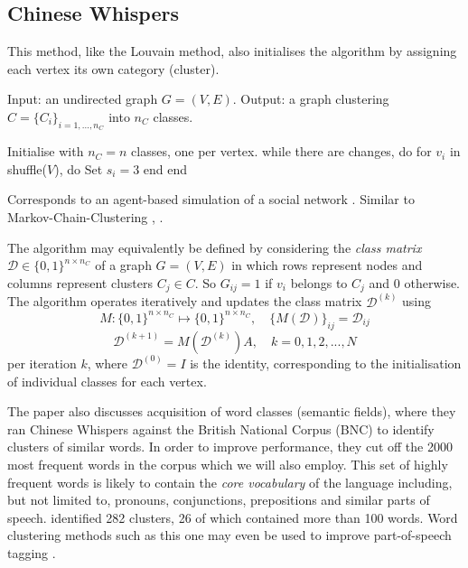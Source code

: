 \documentclass[12pt, a4paper]{article}
\begin{document}

  \subsection{Chinese Whispers}
  This method, like the Louvain method, also initialises the algorithm by assigning each vertex its own category (cluster).

  \begin{algorithm}[language=pseudo, caption={\centering The \textit{Chinese Whispers} algorithm due to \cite{cw-biemann}}]
Input: an undirected graph $G = (V, E)$.
Output: a graph clustering $C = \{C_i\}_{i=1, ..., n_C}$ into $n_C$ classes.

Initialise with $n_C = n$ classes, one per vertex.
while there are changes, do
  for $v_i$ in shuffle($V$), do
    Set $s_i = 3$
  end
end
  \end{algorithm}

  Corresponds to an agent-based simulation of a social network \cite{cw-biemann}.
  Similar to Markov-Chain-Clustering \cite{van-dongen}, \cite{fortunato}.

  The algorithm may equivalently be defined by considering the \textit{class matrix} $\mathcal{D} \in \{0, 1\}^{n \times n_C}$ of a graph $G = (V, E)$ in which rows represent nodes and columns represent clusters $C_j \in C$.
  So $G_{ij} = 1$ if $v_i$ belongs to $C_j$ and $0$ otherwise.
  The algorithm operates iteratively and updates the class matrix $\mathcal{D}^{(k)}$ using
  $$M: \{0, 1\}^{n \times n_C} \mapsto \{0, 1\}^{n \times n_C}, \quad \{M(\mathcal{D})\}_{ij} = \mathcal{D}_{ij}$$ %
  $$\mathcal{D}^{(k+1)} = M(\mathcal{D}^{(k)}) A, \quad k = 0, 1, 2, ..., N$$
  per iteration $k$, where $\mathcal{D}^{(0)} = I$ is the identity, corresponding to the initialisation of individual classes for each vertex.

  The paper also discusses acquisition of word classes (semantic fields), where they ran Chinese Whispers against the British National Corpus (BNC) to identify clusters of similar words.
  In order to improve performance, they cut off the 2000 most frequent words in the corpus which we will also employ.
  This set of highly frequent words is likely to contain the \textit{core vocabulary} of the language including, but not limited to, pronouns, conjunctions, prepositions and similar parts of speech.
  \cite{cw-biemann} identified 282 clusters, 26 of which contained more than 100 words.
  Word clustering methods such as this one may even be used to improve part-of-speech tagging \parencite{ushioda-improved-pos-tagging}.
\end{document}
